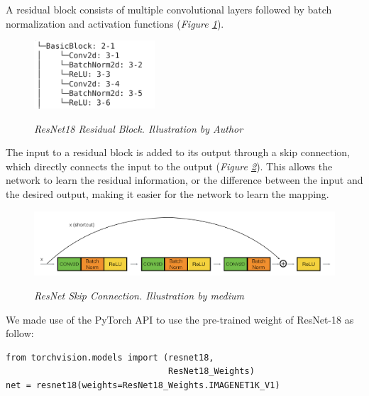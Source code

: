 A residual block
consists of multiple convolutional layers followed by batch normalization and
activation functions (\textit{Figure \ref{fig:resnet-18-residual-block}}).

\begin{figure}[H]
  \centering
  \includegraphics[width=0.4\textwidth]{imatges/methodological_contribution/basic-block.png}
  \caption[ResNet18 Residual Block]{\textit{ResNet18 Residual Block. Illustration by Author}}
  {\label{fig:resnet-18-residual-block}}
\end{figure}

The input to a residual block is added to its output through a skip connection,
which directly connects the input to the output (\textit{Figure
\ref{fig:skip-connection}}). This allows the network to learn the residual
information, or the difference between the input and the desired output, making
it easier for the network to learn the mapping.

\begin{figure}[H]
  \centering
  \includegraphics[width=\textwidth]{imatges/methodological_contribution/skip-connections.png}
  \caption[ResNet Skip Connection]{\textit{ResNet Skip Connection. Illustration by medium}}
  {\label{fig:skip-connection}}
\end{figure}

We made use of the PyTorch API to use the pre-trained weight of ResNet-18 as follow:

\begin{Verbatim}[fontsize=\scriptsize]
from torchvision.models import (resnet18,
                                ResNet18_Weights)
net = resnet18(weights=ResNet18_Weights.IMAGENET1K_V1)
\end{Verbatim}


